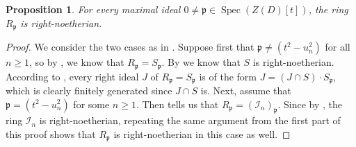 \documentclass{amsart}
\newtheorem{prop}[equation]{Proposition}
\theoremstyle{definition}
\newcommand{\opn}{\operatorname}
\newcommand{\mfrak}[1]{\mathfrak{#1}}
\newcommand{\p}{\mfrak{p}}
\numberwithin{equation}{section}
\begin{document}
\begin{prop}\label{prop:locals-are-noetherian}
For every maximal ideal $0 \ne \p \in \opn{Spec}(Z(D)[t])$,
the ring $R_{\p}$ is right-noetherian.
\end{prop}
\begin{proof}
We consider the two cases as in .
Suppose first that $\p \ne (t^2-u_n^2)$ for all $n \ge 1$,
so by , we know that $R_{\p} = S_{\p}$.
By  we know that $S$ is right-noetherian.
According to \cite[Proposition 2.1.16(iii)]{NCBook},
every right ideal $J$ of $R_{\p} = S_{\p}$ is of the form $J = (J\cap S)\cdot S_{\p}$, which is clearly finitely generated since $J \cap S$ is.
Next, assume that $\p = (t^2-u_n^2)$ for some $n \ge 1$.
Then  tells us that $R_{\p} = \left(\mathcal{I}_n\right)_{\p}$.
Since by , the ring $\mathcal{I}_n$ is right-noetherian, repeating the same argument from the first part of this proof shows that $R_{\p}$ is right-noetherian in this case as well.
\end{proof}
\end{document}
